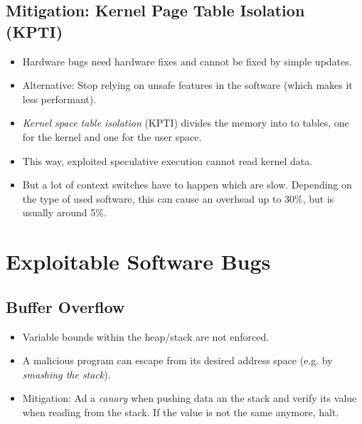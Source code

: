         \subsection{Mitigation: Kernel Page Table Isolation (KPTI)}
            \begin{itemize}
            	\item Hardware bugs need hardware fixes and cannot be fixed by simple updates.
            	\item Alternative: Stop relying on unsafe features in the software (which makes it less performant).
            	\item \textit{Kernel space table isolation} (KPTI) divides the memory into to tables, one for the kernel and one for the user space.
            	\item This way, exploited speculative execution cannot read kernel data.
            	\item But a lot of context switches have to happen which are slow. Depending on the type of used software, this can cause an overhead up to 30\%, but is usually around 5\%.
            \end{itemize}

    \section{Exploitable Software Bugs}
        \subsection{Buffer Overflow}
            \begin{itemize}
            	\item Variable bounds within the heap/stack are not enforced.
            	\item A malicious program can escape from its desired address space (e.g. by \textit{smashing the stack}).
            	\item Mitigation: Ad a \textit{canary} when pushing data an the stack and verify its value when reading from the stack. If the value is not the same anymore, halt.
            \end{itemize}

